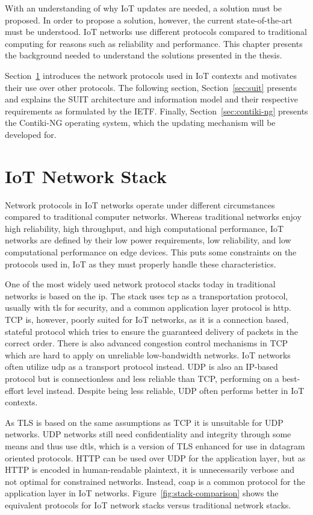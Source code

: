 \documentclass[0-thesis.tex]{subfiles}
\begin{document}
With an understanding of why IoT updates are needed, a solution must be proposed. In order
to propose a solution, however, the current state-of-the-art must be understood. IoT
networks use different protocols compared to traditional computing for reasons such as
reliability and performance. This chapter presents the background needed to understand the
solutions presented in the thesis. 

Section~\ref{sec:network} introduces the network protocols used in IoT contexts and
motivates their use over other protocols. The following section, Section~\ref{sec:suit}
presents and explains the SUIT architecture and information model and their respective
requirements as formulated by the IETF. Finally, Section~\ref{sec:contiki-ng} presents the
Contiki-NG operating system, which the updating mechanism will be developed for.

\section{IoT Network Stack}
\label{sec:network}
Network protocols in IoT networks operate under different circumstances compared to
traditional computer networks. Whereas traditional networks enjoy high reliability, high
throughput, and high computational performance, IoT networks are defined by their low
power requirements, low reliability, and low computational performance on edge devices.
This puts some constraints on the protocols used in, IoT as they must properly handle
these characteristics.

One of the most widely used network protocol stacks today in traditional networks is based
on the \gls{ip}. The stack uses \gls{tcp} as a transportation protocol, usually with
\gls{tls} for security, and a common application layer protocol is \gls{http}. TCP is,
however, poorly suited for IoT networks, as it is a connection based, stateful protocol
which tries to ensure the guaranteed delivery of packets in the correct order. There is
also advanced congestion control mechanisms in TCP which are hard to apply on unreliable
low-bandwidth networks. IoT networks often utilize \gls{udp} as a transport protocol
instead. UDP is also an IP-based protocol but is connectionless and less reliable than
TCP, performing on a best-effort level instead. Despite being less reliable, UDP often
performs better in IoT contexts.

As TLS is based on the same assumptions as TCP it is unsuitable for UDP networks. UDP
networks still need confidentiality and integrity through some means and thus use
\gls{dtls}, which is a version of TLS enhanced for use in datagram oriented protocols.
HTTP can be used over UDP for the application layer, but as HTTP is encoded in
human-readable plaintext, it is unnecessarily verbose and not optimal for constrained
networks. Instead, \gls{coap} is a common protocol for the application layer in IoT
networks. Figure~\ref{fig:stack-comparison} shows the equivalent protocols for IoT network
stacks versus traditional network stacks. 
\end{document}
